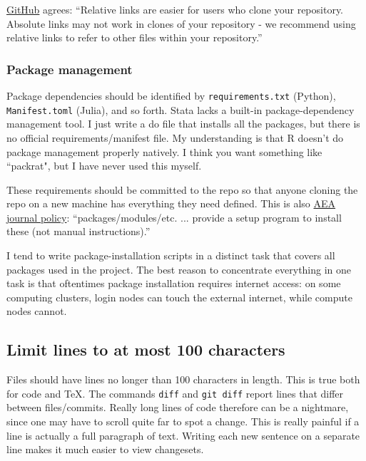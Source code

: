 \href{https://help.github.com/articles/about-readmes/\#relative-links-and-image-paths-in-readme-files}{GitHub} agrees:
``Relative links are easier for users who clone your repository. Absolute links may not work in clones of your repository - we recommend using relative links to refer to other files within your repository.''

\subsubsection{Package management}

Package dependencies should be identified by \texttt{requirements.txt} (Python), \texttt{Manifest.toml} (Julia), and so forth.
Stata lacks a built-in package-dependency management tool.
I just write a do file that installs all the packages, but there is no official requirements/manifest file.
My understanding is that R doesn't do package management properly natively.
I think you want something like ``packrat", but I have never used this myself.

These requirements should be committed to the repo so that anyone cloning the repo on a new machine has everything they need defined.
This is also \href{https://aeadataeditor.github.io/aea-de-guidance/preparing-for-data-deposit.html}{AEA journal policy}:
``packages/modules/etc. ... provide a setup program to install these (not manual instructions).''

I tend to write package-installation scripts in a distinct task that covers all packages used in the project.
The best reason to concentrate everything in one task is that oftentimes package installation requires internet access:
on some computing clusters, login nodes can touch the external internet, while compute nodes cannot.

\subsection{Limit lines to at most 100 characters}

Files should have lines no longer than 100 characters in length.
This is true both for code and \TeX.
The commands \texttt{diff} and \texttt{git diff} report lines that differ between files/commits.
Really long lines of code therefore can be a nightmare, since one may have to scroll quite far to spot a change.
This is really painful if a line is actually a full paragraph of text.
Writing each new sentence on a separate line makes it much easier to view changesets.

